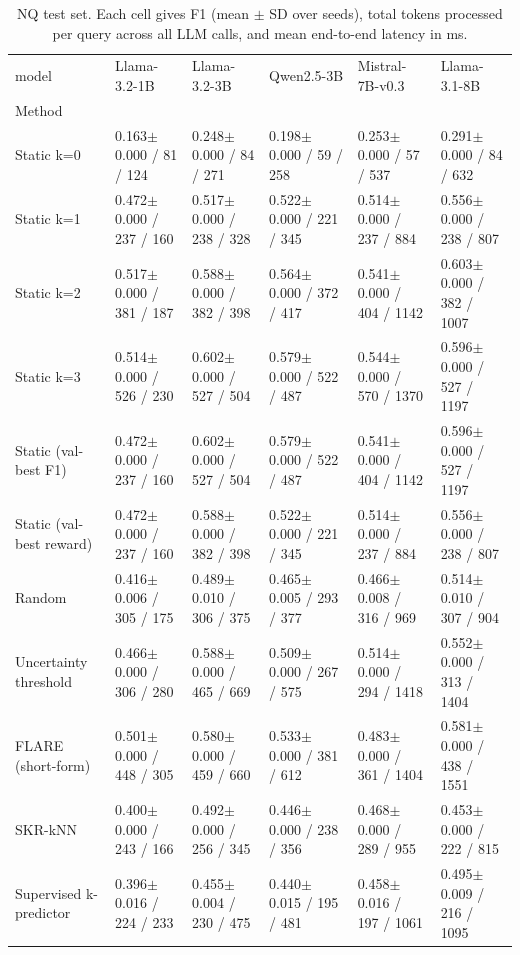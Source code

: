 \begin{table}
\caption{NQ test set. Each cell gives F1 (mean $\pm$ SD over seeds), total tokens processed per query across all LLM calls, and mean end-to-end latency in ms.}
\label{tab:main_nq}
\begin{tabular}{llllll}
\toprule
model & Llama-3.2-1B & Llama-3.2-3B & Qwen2.5-3B & Mistral-7B-v0.3 & Llama-3.1-8B \\
Method &  &  &  &  &  \\
\midrule
Static k=0 & 0.163$\pm$0.000 / 81 / 124 & 0.248$\pm$0.000 / 84 / 271 & 0.198$\pm$0.000 / 59 / 258 & 0.253$\pm$0.000 / 57 / 537 & 0.291$\pm$0.000 / 84 / 632 \\
Static k=1 & 0.472$\pm$0.000 / 237 / 160 & 0.517$\pm$0.000 / 238 / 328 & 0.522$\pm$0.000 / 221 / 345 & 0.514$\pm$0.000 / 237 / 884 & 0.556$\pm$0.000 / 238 / 807 \\
Static k=2 & 0.517$\pm$0.000 / 381 / 187 & 0.588$\pm$0.000 / 382 / 398 & 0.564$\pm$0.000 / 372 / 417 & 0.541$\pm$0.000 / 404 / 1142 & 0.603$\pm$0.000 / 382 / 1007 \\
Static k=3 & 0.514$\pm$0.000 / 526 / 230 & 0.602$\pm$0.000 / 527 / 504 & 0.579$\pm$0.000 / 522 / 487 & 0.544$\pm$0.000 / 570 / 1370 & 0.596$\pm$0.000 / 527 / 1197 \\
Static (val-best F1) & 0.472$\pm$0.000 / 237 / 160 & 0.602$\pm$0.000 / 527 / 504 & 0.579$\pm$0.000 / 522 / 487 & 0.541$\pm$0.000 / 404 / 1142 & 0.596$\pm$0.000 / 527 / 1197 \\
Static (val-best reward) & 0.472$\pm$0.000 / 237 / 160 & 0.588$\pm$0.000 / 382 / 398 & 0.522$\pm$0.000 / 221 / 345 & 0.514$\pm$0.000 / 237 / 884 & 0.556$\pm$0.000 / 238 / 807 \\
Random & 0.416$\pm$0.006 / 305 / 175 & 0.489$\pm$0.010 / 306 / 375 & 0.465$\pm$0.005 / 293 / 377 & 0.466$\pm$0.008 / 316 / 969 & 0.514$\pm$0.010 / 307 / 904 \\
Uncertainty threshold & 0.466$\pm$0.000 / 306 / 280 & 0.588$\pm$0.000 / 465 / 669 & 0.509$\pm$0.000 / 267 / 575 & 0.514$\pm$0.000 / 294 / 1418 & 0.552$\pm$0.000 / 313 / 1404 \\
FLARE (short-form) & 0.501$\pm$0.000 / 448 / 305 & 0.580$\pm$0.000 / 459 / 660 & 0.533$\pm$0.000 / 381 / 612 & 0.483$\pm$0.000 / 361 / 1404 & 0.581$\pm$0.000 / 438 / 1551 \\
SKR-kNN & 0.400$\pm$0.000 / 243 / 166 & 0.492$\pm$0.000 / 256 / 345 & 0.446$\pm$0.000 / 238 / 356 & 0.468$\pm$0.000 / 289 / 955 & 0.453$\pm$0.000 / 222 / 815 \\
Supervised k-predictor & 0.396$\pm$0.016 / 224 / 233 & 0.455$\pm$0.004 / 230 / 475 & 0.440$\pm$0.015 / 195 / 481 & 0.458$\pm$0.016 / 197 / 1061 & 0.495$\pm$0.009 / 216 / 1095 \\

\end{tabular}
\end{table}
